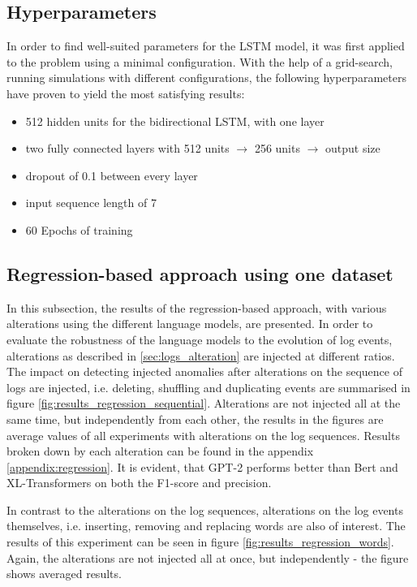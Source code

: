 \subsection{Hyperparameters}
In order to find well-suited parameters for the LSTM model, it was first applied to the problem using a minimal configuration. With the help of a grid-search, running simulations with different configurations, the following hyperparameters have proven to yield the most satisfying results:
\begin{itemize}
	\item 512 hidden units for the bidirectional LSTM, with one layer
	\item two fully connected layers with 512 units $\rightarrow$ 256 units $\rightarrow$ output size
	\item dropout of 0.1 between every layer
	\item input sequence length of 7
	\item 60 Epochs of training
\end{itemize}

\subsection{Regression-based approach using one dataset\label{sec:results-regression}}
In this subsection, the results of the regression-based approach, with various alterations using the different language models, are presented. In order to evaluate the robustness of the language models to the evolution of log events, alterations as described in \ref{sec:logs_alteration} are injected at different ratios. The impact on detecting injected anomalies after alterations on the sequence of logs are injected, i.e. deleting, shuffling and duplicating events are summarised in figure \ref{fig:results_regression_sequential}. Alterations are not injected all at the same time, but independently from each other, the results in the figures are average values of all experiments with alterations on the log sequences. Results broken down by each alteration can be found in the appendix \ref{appendix:regression}. It is evident, that GPT-2 performs better than Bert and XL-Transformers on both the F1-score and precision.

In contrast to the alterations on the log sequences, alterations on the log events themselves, i.e. inserting, removing and replacing words are also of interest. The results of this experiment can be seen in figure \ref{fig:results_regression_words}. Again, the alterations are not injected all at once, but independently - the figure shows averaged results.

